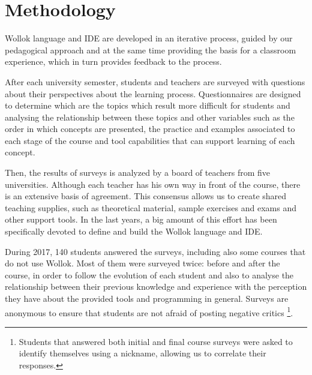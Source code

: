 \section{Methodology}
\label{sec:methodology}
Wollok language and IDE are developed in an iterative process, guided by our pedagogical approach 
and at the same time providing the basis for a classroom experience, 
which in turn provides feedback to the process.

After each university semester, students and teachers are surveyed with questions about their perspectives about the learning process.
Questionnaires are designed to determine which are the topics which result more difficult for students 
and analysing the relationship between these topics and other variables such as 
the order in which concepts are presented,
the practice and examples associated to each stage of the course
and tool capabilities that can support learning of each concept.

Then, the results of surveys is analyzed by a board of teachers from five universities.
Although each teacher has his own way in front of the course, there is an extensive basis of agreement.
This consensus allows us to create shared teaching supplies, such as theoretical material, sample exercises and exams and other support tools.
In the last years, a big amount of this effort has been specifically devoted to define and build the Wollok language and IDE.

\medskip

During 2017, 140 students answered the surveys, including also some courses that do not use Wollok.
Most of them were surveyed twice: before and after the course, in order to follow the evolution of each student
and also to analyse the relationship between their previous knowledge and experience with the perception they have about the provided tools and programming in general.
Surveys are anonymous to ensure that students are not afraid of posting negative critics%
\footnote{Students that answered both initial and final course surveys were asked to identify themselves using a nickname, allowing us to correlate their responses.}.


